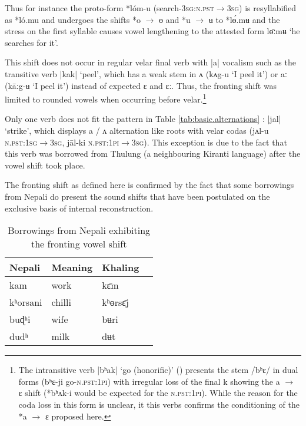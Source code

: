 \documentclass[oldfontcommands,oneside,a4paper,11pt]{article}
\newcommand{\ipa}[1]{{\phon \mbox{#1}}} %
\begin{document}
Thus for instance  the proto-form *\ipa{lóm-u} (search-\textsc{3sg:n.pst$\rightarrow$3sg}) is resyllabified as *\ipa{ló.mu} and undergoes the shifts *\ipa{o} $\rightarrow$ \ipa{ɵ} and *\ipa{u} $\rightarrow$ \ipa{ʉ} to  *\ipa{lɵ́.mʉ} and the stress on the first syllable causes vowel lengthening to the attested form \ipa{lɵ̄ːmʉ} `he searches for it'.

This shift does not occur in regular velar final verb with |a| vocalism such as the transitive verb |kak| `peel', which has a weak stem in \ipa{ʌ} (\ipa{kʌg-u} `I peel it') or \ipa{aː}  (\ipa{kāːg-ʉ} `I peel it') instead of expected \ipa{ɛ} and \ipa{ɛː}.  Thus, the fronting shift was limited to rounded vowels when occurring before velar.\footnote{The intransitive   verb |\ipa{bʰak}| `go (honorific)' (\citealt[1115]{jacques12khaling}) presents the stem  /\ipa{bʰɛ}/ in dual forms (\ipa{bʰɛ-ji} go-\textsc{n.pst:1pi}) with irregular loss of  the final \ipa{k} showing the \ipa{a} $\rightarrow$ \ipa{ɛ} shift (*\ipa{bʰʌk-i} would be expected for the \textsc{n.pst:1pi}). While the reason for the coda loss in this form is unclear, it this verbs confirms the conditioning of the *\ipa{a} $\rightarrow$ \ipa{ɛ} proposed here.}

 Only one verb  does not fit the pattern in Table \ref{tab:basic.alternations} :  |\ipa{jal}|  `strike', which displays \ipa{a} / \ipa{ʌ} alternation like roots with velar codas (\ipa{jʌl-u} \textsc{n.pst:1sg$\rightarrow$3sg}, \ipa{ja‍̄l-ki} \textsc{n.pst:1pi$\rightarrow$3sg}). This exception is due to the fact that this verb was borrowed from Thulung (a neighbouring Kiranti language) after the vowel shift took place.

The fronting shift as defined here is confirmed   by the fact that some borrowings from Nepali do present the sound shifts that have been postulated on the exclusive basis of internal reconstruction.

\begin{table}
\caption{Borrowings from Nepali exhibiting the fronting vowel shift} \label{tab:nep.fronting} \centering
\begin{tabular}{llll}
\toprule
Nepali & Meaning & Khaling \\
\midrule
\ipa{kam} & work & \ipa{kɛ̄m} \\
\ipa{kʰorsani} & chilli&\ipa{kʰɵrsɛ̄j}\\
\ipa{buɖʰi} & wife&\ipa{bʉri}\\
\ipa{dudʰ} & milk&\ipa{dʉt}\\
\bottomrule
\end{tabular}
\end{table}
\end{document}
